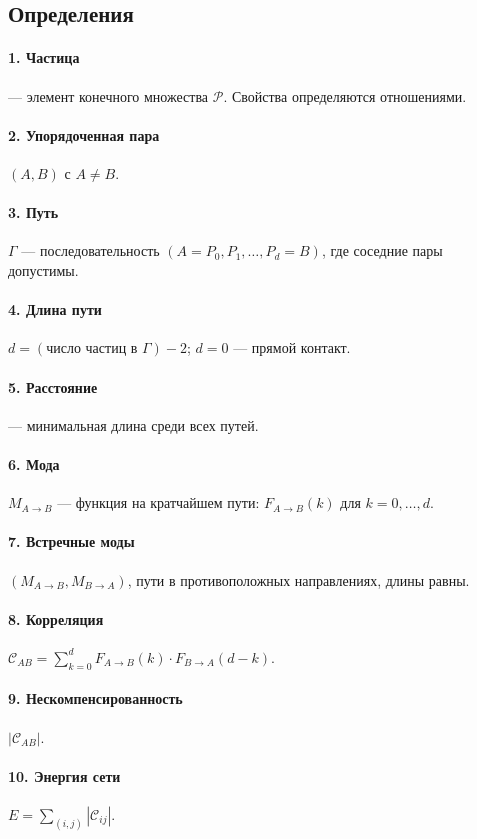 \documentclass[12pt,a4paper]{article}
\begin{document}
\subsection{Определения}

\paragraph{1. Частица} --- элемент конечного множества $\mathcal{P}$. Свойства определяются отношениями.
\paragraph{2. Упорядоченная пара} $(A,B)$ с $A \neq B$.
\paragraph{3. Путь} $\Gamma$ --- последовательность $(A=P_0, P_1, \dots, P_d=B)$, где соседние пары допустимы.
\paragraph{4. Длина пути} $d = (\text{число частиц в }\Gamma) - 2$; $d=0$ --- прямой контакт.
\paragraph{5. Расстояние} --- минимальная длина среди всех путей.
\paragraph{6. Мода} $M_{A \to B}$ --- функция на кратчайшем пути: $F_{A \to B}(k)$ для $k=0,\dots,d$.
\paragraph{7. Встречные моды} $(M_{A \to B}, M_{B \to A})$, пути в противоположных направлениях, длины равны.
\paragraph{8. Корреляция} $\mathcal{C}_{AB} = \sum_{k=0}^{d} F_{A \to B}(k) \cdot F_{B \to A}(d-k)$.
\paragraph{9. Нескомпенсированность} $|\mathcal{C}_{AB}|$.
\paragraph{10. Энергия сети} $E = \sum_{(i,j)} |\mathcal{C}_{ij}|$.
\end{document}
